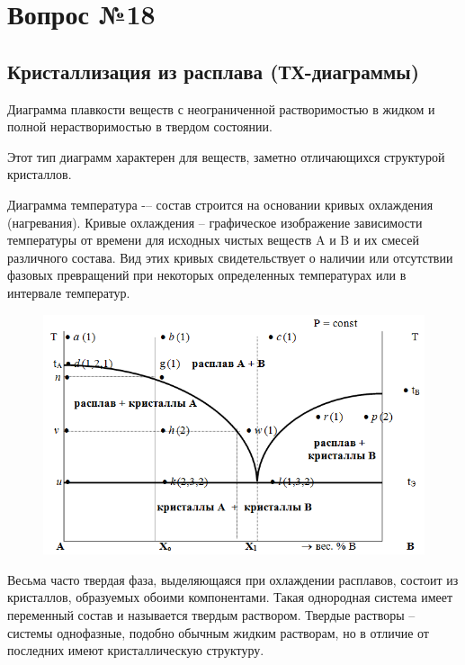 \documentclass[14pt,a4paper]{scrartcl}
\begin{document}
\section*{Вопрос №18}
\subsection*{Кристаллизация из расплава (ТХ-диаграммы)}
Диаграмма плавкости веществ с неограниченной растворимостью в жидком и полной нерастворимостью в твердом состоянии.

Этот тип диаграмм характерен для веществ, заметно отличающихся структурой кристаллов.

Диаграмма температура -– состав строится на основании кривых охлаждения (нагревания). Кривые охлаждения – графическое изображение зависимости температуры от времени для исходных чистых веществ A и B и их смесей различного состава. Вид этих кривых свидетельствует о наличии или отсутствии фазовых превращений при некоторых определенных температурах или в интервале температур. 
\begin{figure}[H]
\centering
\includegraphics[scale=.45]{cristallization-diagram.png}
\caption{}
\label{}
\end{figure}

Весьма часто твердая фаза, выделяющаяся при охлаждении расплавов, состоит из кристаллов, образуемых обоими компонентами. Такая однородная система имеет переменный состав и называется твердым раствором. Твердые растворы – системы однофазные, подобно обычным жидким растворам, но в отличие от последних имеют кристаллическую структуру.
\end{document}
